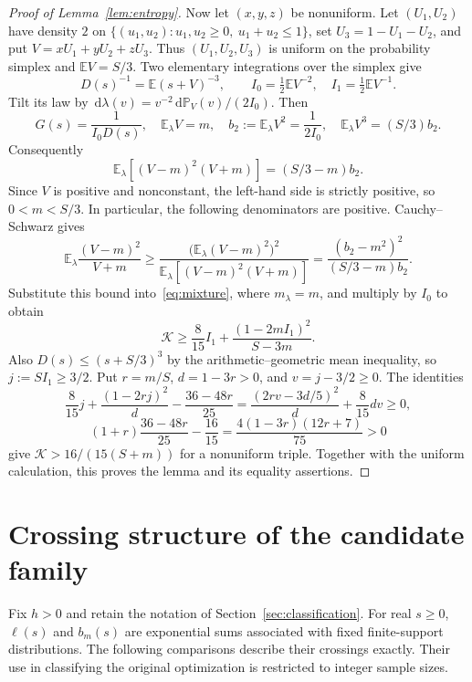 \documentclass[11pt]{article}
\numberwithin{equation}{section}
\newcommand{\dd}{\,\mathrm d}
\newcommand{\EE}{\mathbb E}
\newcommand{\K}{\mathcal K}
\begin{document}
\begin{proof}[Proof of Lemma~\ref{lem:entropy}]
Now let $(x,y,z)$ be nonuniform. Let $(U_1,U_2)$ have density $2$ on
$\{(u_1,u_2):u_1,u_2\ge0,\ u_1+u_2\le1\}$, set $U_3=1-U_1-U_2$, and
put $V=xU_1+yU_2+zU_3$. Thus $(U_1,U_2,U_3)$ is uniform on the probability
simplex and $\EE V=S/3$. Two elementary integrations over the simplex give
\[
 D(s)^{-1}=\EE(s+V)^{-3},\qquad
 I_0=\tfrac12\EE V^{-2},\quad I_1=\tfrac12\EE V^{-1}.
\]
Tilt its law by $\dd\lambda(v)=v^{-2}\dd\mathbb P_V(v)/(2I_0)$. Then
\[
 G(s)=\frac1{I_0D(s)},\quad
 \EE_\lambda V=m,\quad b_2:=\EE_\lambda V^2=\frac1{2I_0},\quad
 \EE_\lambda V^3=(S/3)b_2.
\]
Consequently
\[
 \EE_\lambda[(V-m)^2(V+m)]=(S/3-m)b_2.
\]
Since $V$ is positive and nonconstant, the left-hand side is strictly
positive, so $0<m<S/3$. In particular, the following denominators are
positive. Cauchy--Schwarz gives
\[
 \EE_\lambda\frac{(V-m)^2}{V+m}
 \ge\frac{\bigl(\EE_\lambda(V-m)^2\bigr)^2}
            {\EE_\lambda[(V-m)^2(V+m)]}
 =\frac{(b_2-m^2)^2}{(S/3-m)b_2}.
\]
Substitute this bound into~\eqref{eq:mixture}, where $m_\lambda=m$, and
multiply by $I_0$ to obtain
\[
 \K\ge\frac8{15}I_1+\frac{(1-2mI_1)^2}{S-3m}.
\]
Also $D(s)\le(s+S/3)^3$ by the arithmetic--geometric mean inequality,
so $j:=SI_1\ge3/2$. Put $r=m/S$, $d=1-3r>0$, and $v=j-3/2\ge0$.
The identities
\[
 \frac8{15}j+\frac{(1-2rj)^2}{d}-\frac{36-48r}{25}
 =\frac{(2rv-3d/5)^2}{d}+\frac8{15}dv\ge0,
\]
\[
 (1+r)\frac{36-48r}{25}-\frac{16}{15}
 =\frac{4(1-3r)(12r+7)}{75}>0
\]
give $\K>16/(15(S+m))$ for a nonuniform triple. Together with the uniform
calculation, this proves the lemma and its equality assertions.
\end{proof}

\section{Crossing structure of the candidate family}\label{app:crossings}
Fix $h>0$ and retain the notation of Section~\ref{sec:classification}.
For real $s\ge0$, $\ell(s)$ and $b_m(s)$ are exponential sums associated
with fixed finite-support distributions. The following comparisons describe
their crossings exactly. Their use in classifying the original optimization
is restricted to integer sample sizes.
\end{document}
